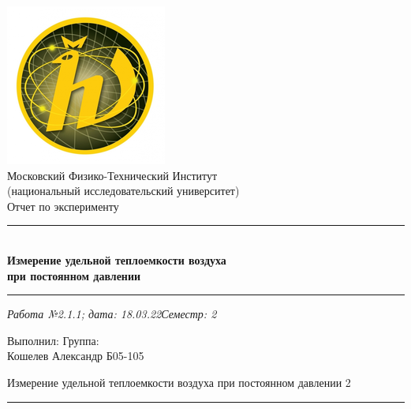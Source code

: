 \documentclass[12pt,a4paper]{scrartcl}
\begin{document}
	\begin{titlepage}
		
		\vspace*{\fill}
		
		\begin{center}
			\includegraphics[scale=0.8]{MIPT.png}
			\\[0.7cm]\Huge Московский Физико-Технический Институт\\(национальный исследовательский университет)
			\\[2cm]\LARGE Отчет по эксперименту
			\\[0.5cm]\noindent\rule{\textwidth}{1pt}
			\\\Huge\textbf{Измерение удельной теплоемкости воздуха\\при постоянном давлении}
			\\[-0.5cm]\noindent\rule{\textwidth}{1pt}
		\end{center}
		
		\begin{flushleft}
			\textit{Работа №2.1.1; дата: 18.03.22}\hfill\textit{Семестр: 2}
		\end{flushleft}
		
		\vspace*{\fill}
		
		\begin{flushleft}
			Выполнил: \hspace{\fill} Группа:
			\\Кошелев Александр \hspace{\fill} Б05-105
		\end{flushleft}
	\end{titlepage}
	
	
	\begin{flushleft}
		\footnotesize{Измерение удельной теплоемкости воздуха при постоянном давлении} \hspace{\fill} \footnotesize{2}
		\\[-0.3cm]\noindent\rule{\textwidth}{0.3pt}
	\end{flushleft}
	
\end{document}

